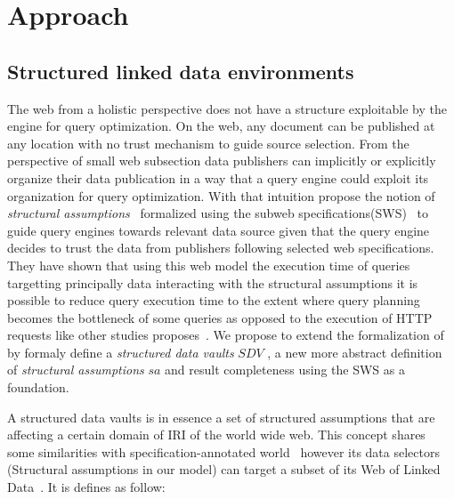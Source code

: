 \section{Approach}



\subsection{Structured linked data environments}
The web from a holistic perspective does not have a structure exploitable by the engine for query optimization.
On the web, any document can be published at any location with no trust mechanism to guide source selection.
From the perspective of small web subsection data publishers can implicitly or explicitly organize their data publication in a way that a query engine could exploit 
its organization for query optimization.
With that intuition \citeauthor{Taelman2023} propose the notion of \emph{structural assumptions}~\cite{Taelman2023} formalized using the subweb specifications(SWS)~\cite{Bogaerts2021LinkTW}
to guide query engines towards relevant data source given that the query engine decides to trust the data from publishers following selected web specifications.
They have shown that using this web model the execution time of queries targetting principally data interacting with the structural assumptions it is possible to 
reduce query execution time to the extent where query planning becomes the bottleneck of some queries as opposed to the execution of HTTP requests like other studies proposes~\cite{Taelman2023, hartig2016walking}.
We propose to extend the formalization of \citeauthor{Taelman2023} by formaly define a \emph{structured data vaults} $SDV$ , a new more abstract definition of \emph{structural assumptions} $sa$ and result completeness 
using the SWS as a foundation.

A structured data vaults is in essence a set of structured assumptions that are affecting a certain domain of IRI of the world wide web.
This concept shares some similarities with specification-annotated world~\cite{Bogaerts2021LinkTW} however its data selectors (Structural assumptions in our model) can target a subset of
its Web of Linked Data~\cite{Bogaerts2021LinkTW}.
It is defines as follow:

